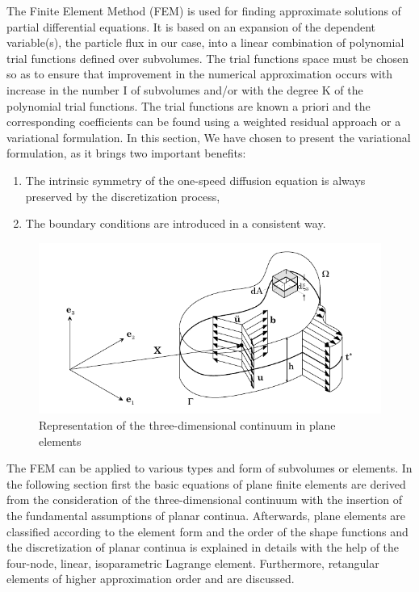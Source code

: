 The Finite Element Method (FEM) is used for finding approximate solutions of partial
differential equations. It is based on an expansion of the dependent variable(s), the
particle flux in our case, into a linear combination of polynomial trial functions defined
over subvolumes. The trial functions space must be chosen so as to ensure that improvement in the numerical approximation occurs with increase in the number I of subvolumes and/or
with the degree K of the polynomial trial functions. The trial functions are known a priori and the corresponding coefficients can be found using a weighted residual approach or a variational formulation. In this section, We have chosen to present the variational formulation, as it brings two important benefits:
\begin{enumerate}
    \item The intrinsic symmetry of the one-speed diffusion equation is always preserved by
the discretization process,
    \item The boundary conditions are introduced in a consistent way.
\end{enumerate} 

\begin{figure}[h!]
    \centering
    \includegraphics[scale=0.6]{Figures/Chapter2/planeElement.png}
    \decoRule   
    \caption{Representation of the three-dimensional continuum in plane elements}
    \label{fig:plane-element}
\end{figure}
\noindent
The FEM can be applied to various types and form of subvolumes or elements. In the following section first the basic equations of plane finite elements are derived from the
consideration of the three-dimensional continuum with the insertion of the fundamental assumptions of planar continua. Afterwards, plane elements are classified according to the element form and the order of the shape functions and the discretization of planar continua is explained in
details with the help of the four-node, linear, isoparametric Lagrange element. Furthermore,
retangular elements of higher approximation order and are discussed.

